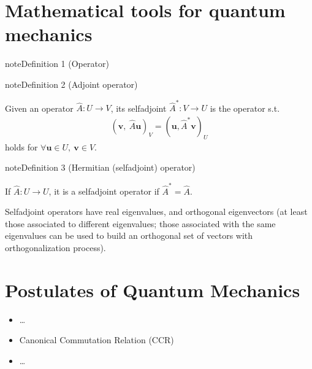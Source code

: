 \documentclass[letterpaper,10pt,english]{jupyterBook}
\begin{document}
\section{Mathematical tools for quantum mechanics}
\label{\detokenize{ch/quantum-mechanics/intro:mathematical-tools-for-quantum-mechanics}}\label{ch/quantum-mechanics/intro:Operator}
\begin{sphinxadmonition}{note}{Definition 1 (Operator)}


\end{sphinxadmonition}
\label{ch/quantum-mechanics/intro:Adjoint Operator}
\begin{sphinxadmonition}{note}{Definition 2 (Adjoint operator)}



\sphinxAtStartPar
Given an operator \(\hat{A}: U \rightarrow V\), its self\sphinxhyphen{}adjoint \(\hat{A}^*: V \rightarrow U\) is the operator s.t.
\begin{equation*}
\begin{split}(\mathbf{v}, \ \hat{A} \mathbf{u})_{V} = (\mathbf{u}, \hat{A}^* \mathbf{v} )_{U}\end{split}
\end{equation*}
\sphinxAtStartPar
holds for \(\forall \mathbf{u} \in U, \ \mathbf{v} \in V\).
\end{sphinxadmonition}
\label{ch/quantum-mechanics/intro:Self-Adjoint Operator}
\begin{sphinxadmonition}{note}{Definition 3 (Hermitian (self\sphinxhyphen{}adjoint) operator)}



\sphinxAtStartPar
If \(\hat{A}: U \rightarrow U\), it is a self\sphinxhyphen{}adjoint operator if \(\hat{A}^* = \hat{A}\).
\end{sphinxadmonition}

\sphinxAtStartPar
Self\sphinxhyphen{}adjoint operators have real eigenvalues, and orthogonal eigenvectors (at least those associated to different eigenvalues; those associated with the same eigenvalues can be used to build an orthogonal set of vectors with orthogonalization process).


\section{Postulates of Quantum Mechanics}
\label{\detokenize{ch/quantum-mechanics/intro:postulates-of-quantum-mechanics}}\begin{itemize}
\item {} 
\sphinxAtStartPar
…

\item {} 
\sphinxAtStartPar
Canonical Commutation Relation (CCR) 

\item {} 
\sphinxAtStartPar
…

\end{itemize}
\end{document}
